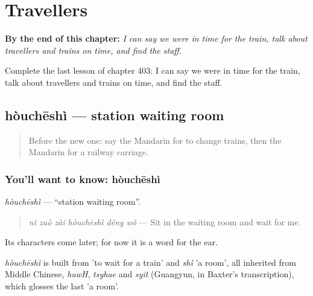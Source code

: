 
\chapter{Travellers}
\label{ch:zh-travellers}

\begin{chapteropening}
\textbf{By the end of this chapter:} \emph{I can say we were in time for the train, talk about travellers and trains on time, and find the staff.}

Complete the last lesson of chapter 403: I can say we were in time for the train, talk about travellers and trains on time, and find the staff.
\end{chapteropening}

\section[hòuchēshì]{hòuchēshì — station waiting room}

\label{lesson:ZH-C403-houcheshi}



\begin{quote}
Before the new one: say the Mandarin for to change trains, then the Mandarin for a railway carriage.
\end{quote}

\subsection*{You'll want to know: hòuchēshì}
\emph{hòuchēshì} — \textquotedblleft{}station waiting room\textquotedblright{}.

\begin{quote}
\emph{nǐ zuò zài hòuchēshì děng wǒ} — Sit in the waiting room and wait for me.
\end{quote}

Its characters come later; for now it is a word for the ear.

\begin{cousinweb}
\emph{hòuchēshì} is built from  'to wait for a train' and \emph{shì} 'a room', all inherited from Middle Chinese, \emph{huwH}, \emph{tsyhae} and \emph{syit} (Guangyun, in Baxter's transcription), which glosses the last 'a room'.
\end{cousinweb}

